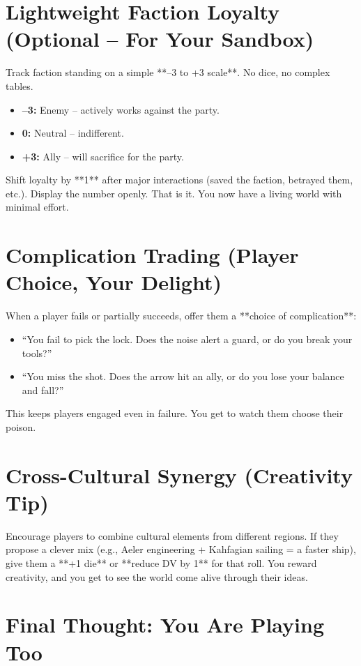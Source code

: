 \section{Lightweight Faction Loyalty (Optional – For Your Sandbox)}

Track faction standing on a simple **–3 to +3 scale**. No dice, no complex tables.

\begin{itemize}
  \item \textbf{–3:} Enemy – actively works against the party.
  \item \textbf{0:} Neutral – indifferent.
  \item \textbf{+3:} Ally – will sacrifice for the party.
\end{itemize}

Shift loyalty by **1** after major interactions (saved the faction, betrayed them, etc.). Display the number openly. That is it. You now have a living world with minimal effort.

\section{Complication Trading (Player Choice, Your Delight)}

When a player fails or partially succeeds, offer them a **choice of complication**:
\begin{itemize}
  \item “You fail to pick the lock. Does the noise alert a guard, or do you break your tools?”
  \item “You miss the shot. Does the arrow hit an ally, or do you lose your balance and fall?”
\end{itemize}
This keeps players engaged even in failure. You get to watch them choose their poison.

\section{Cross-Cultural Synergy (Creativity Tip)}

Encourage players to combine cultural elements from different regions. If they propose a clever mix (e.g., Aeler engineering + Kahfagian sailing = a faster ship), give them a **+1 die** or **reduce DV by 1** for that roll. You reward creativity, and you get to see the world come alive through their ideas.

\section{Final Thought: You Are Playing Too}

